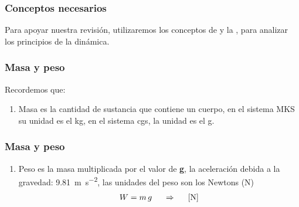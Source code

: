 \documentclass[14pt]{beamer}
\begin{document}
\begin{frame}
\frametitle{Conceptos necesarios}
Para apoyar nuestra revisión, utilizaremos los conceptos de  y la , para analizar los principios de la dinámica.
\end{frame}
\begin{frame}
\frametitle{Masa y peso}
Recordemos que:
\begin{enumerate}[<+->]
\item Masa es la cantidad de sustancia que contiene un cuerpo, \pause en el sistema MKS su unidad es el \unit{\kilo\gram}, \pause en el sistema cgs, la unidad es el \unit{\gram}.
\seti
\end{enumerate}
\end{frame}
\begin{frame}
\frametitle{Masa y peso}
\begin{enumerate}[<+->]
\conti
\item Peso es la masa multiplicada por el valor de \textbf{g}, \pause la aceleración debida a la gravedad: \SI{9.81}{\meter\per\square\second}, \pause las unidades del peso son los Newtons (\unit{\newton})
\pause
\begin{align*}
W = m \, g \hspace{0.5cm} \Rightarrow \hspace{0.5cm} \left[ \unit{\newton} \right]
\end{align*}
\end{enumerate}
\end{frame}    
\end{document}
